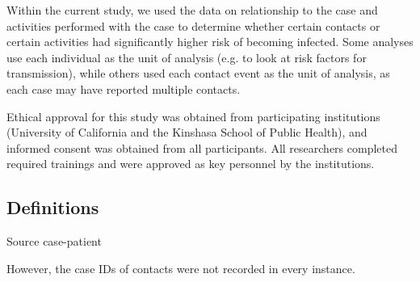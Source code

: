 Within the current study, we used the data on relationship to the case and activities performed with the case to determine whether certain contacts or certain activities had significantly higher risk of becoming infected. 
Some analyses use each individual as the unit of analysis (e.g. to look at risk factors for transmission), while others used each contact event as the unit of analysis, as each case may have reported multiple contacts. 

Ethical approval for this study was obtained from participating institutions (University of California and the Kinshasa School of Public Health), and informed consent was obtained from all participants. All researchers completed required trainings and were approved as key personnel by the institutions. 

\subsection{Definitions}
Source case-patient \cite{Dixon2015}

However, the case IDs of contacts were not recorded in every instance.




